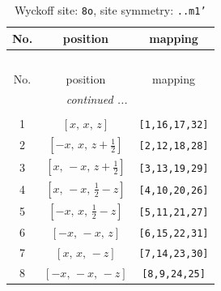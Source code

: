 \documentclass[fleqn,8pt]{jsarticle}
\begin{document}
\begin{longtable}{ccc}
\caption{Wyckoff site: {\tt 8o}, site symmetry: {\tt ..m1'}}
 \\
 \hline \hline
No. & position & mapping \\ \hline \endfirsthead

\multicolumn{2}{l}{\tablename\ \thetable{}} \\
 \hline \hline
No. & position & mapping \\ \hline \endhead

 \hline \hline
\multicolumn{2}{r}{\footnotesize\it continued ...} \\ \endfoot

 \hline \hline
\multicolumn{2}{r}{} \\ \endlastfoot

1 & $\left[ x,\, x,\, z \right]$ & {\tt [1,16,17,32]} \\ \hline
2 & $\left[ - x,\, x,\, z + \frac{1}{2} \right]$ & {\tt [2,12,18,28]} \\ \hline
3 & $\left[ x,\, - x,\, z + \frac{1}{2} \right]$ & {\tt [3,13,19,29]} \\ \hline
4 & $\left[ x,\, - x,\, \frac{1}{2} - z \right]$ & {\tt [4,10,20,26]} \\ \hline
5 & $\left[ - x,\, x,\, \frac{1}{2} - z \right]$ & {\tt [5,11,21,27]} \\ \hline
6 & $\left[ - x,\, - x,\, z \right]$ & {\tt [6,15,22,31]} \\ \hline
7 & $\left[ x,\, x,\, - z \right]$ & {\tt [7,14,23,30]} \\ \hline
8 & $\left[ - x,\, - x,\, - z \right]$ & {\tt [8,9,24,25]} \\
\end{longtable}
\renewcommand{\arraystretch}{1.2}
\end{document}
